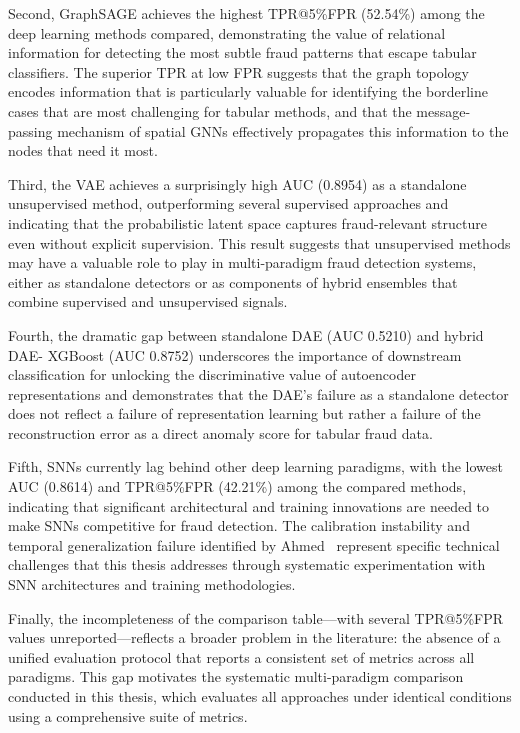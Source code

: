 Second, GraphSAGE achieves the highest TPR@5\%FPR (52.54\%) among the deep
learning methods compared, demonstrating the value of relational information for
detecting the most subtle fraud patterns that escape tabular classifiers. The
superior TPR at low FPR suggests that the graph topology encodes information
that is particularly valuable for identifying the borderline cases that are most
challenging for tabular methods, and that the message-passing mechanism of
spatial GNNs effectively propagates this information to the nodes that need it
most.

Third, the VAE achieves a surprisingly high AUC (0.8954) as a standalone
unsupervised method, outperforming several supervised approaches and indicating
that the probabilistic latent space captures fraud-relevant structure even
without explicit supervision. This result suggests that unsupervised methods may
have a valuable role to play in multi-paradigm fraud detection systems, either
as standalone detectors or as components of hybrid ensembles that combine
supervised and unsupervised signals.

Fourth, the dramatic gap between standalone DAE (AUC 0.5210) and hybrid DAE-
XGBoost (AUC 0.8752) underscores the importance of downstream classification for
unlocking the discriminative value of autoencoder representations and
demonstrates that the DAE's failure as a standalone detector does not reflect a
failure of representation learning but rather a failure of the reconstruction
error as a direct anomaly score for tabular fraud data.

Fifth, SNNs currently lag behind other deep learning paradigms, with the lowest
AUC (0.8614) and TPR@5\%FPR (42.21\%) among the compared methods, indicating
that significant architectural and training innovations are needed to make SNNs
competitive for fraud detection. The calibration instability and temporal
generalization failure identified by Ahmed~\cite{ahmed2025bioinspired} represent
specific technical challenges that this thesis addresses through systematic
experimentation with SNN architectures and training methodologies.

Finally, the incompleteness of the comparison table---with several TPR@5\%FPR
values unreported---reflects a broader problem in the literature: the absence of
a unified evaluation protocol that reports a consistent set of metrics across
all paradigms. This gap motivates the systematic multi-paradigm comparison
conducted in this thesis, which evaluates all approaches under identical
conditions using a comprehensive suite of metrics.

